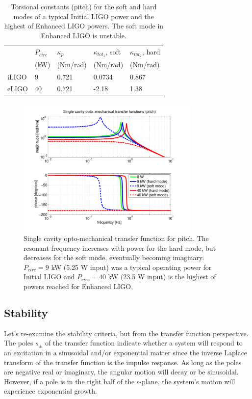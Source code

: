 \begin{table}
\centering
\caption{Torsional constants (pitch) for the soft and hard modes of a typical
  Initial LIGO power and the highest of Enhanced LIGO powers. The soft
mode in Enhanced LIGO is unstable.}
\begin{tabular}{l l l l l}
 & $P_{circ}$ & $\kappa_{p}$ & $\kappa_{tot_1}$, soft &
 $\kappa_{tot_2}$, hard \\
 & (kW) & (Nm/rad) & (Nm/rad) & (Nm/rad) \\
\hline\hline
iLIGO & 9 & 0.721 & 0.0734 & 0.867 \\
eLIGO & 40 & 0.721 & -2.18 & 1.38 \\
\hline
\end{tabular}
\label{table:k_tot}
\end{table}



\begin{figure}
\begin{centering}
\includegraphics[width=0.8\textwidth]{figures/iLIGOeLIGOhardsoftmodes.pdf}
\caption{Single cavity opto-mechanical transfer function for
  pitch. The resonant frequency increases with power for the hard
  mode, but decreases for the soft mode, eventually becoming
  imaginary. $P_{circ} = 9$ kW (5.25 W input) was a typical operating power for
  Initial LIGO and $P_{circ} = 40$ kW (23.5 W input) is the highest of powers reached
for Enhanced LIGO.}
\label{fig:optomechhardsoft}
\end{centering}
\end{figure}


\subsection{Stability}
Let's re-examine the stability criteria, but from the transfer
function perspective. The poles $s_\pm$ of the transfer function
indicate whether a system will respond to an excitation in a
sinusoidal and/or exponential matter since the inverse Laplace
transform of the transfer function is the impulse response. As long as
the poles are negative real or imaginary, the angular motion will
decay or be sinusoidal. However, if a pole is in the right half of the
s-plane, the system's motion will experience exponential growth.

